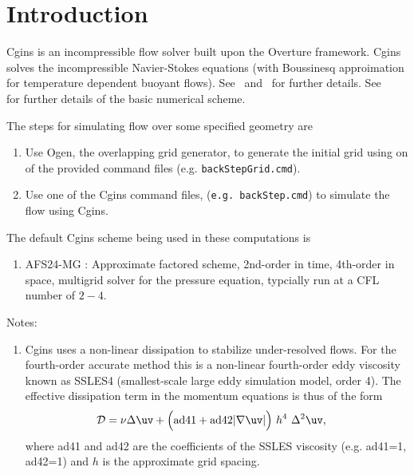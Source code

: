 \documentclass[11pt]{article}
\newcommand{\grad}{\nabla}
\begin{document}
\tableofcontents

\clearpage


\section{Introduction}

Cgins is an incompressible flow solver built upon the Overture framework.
Cgins solves the incompressible Navier-Stokes equations (with Boussinesq approimation
for temperature dependent buoyant flows). See~\cite{CginsUserGuide} and~\cite{CginsReferenceManual} for further 
details. See~\cite{ICNS}~\cite{splitStep2003} for further details of the basic numerical scheme. 

The steps for simulating flow over some specified geometry are
\begin{enumerate}
  \item Use Ogen, the overlapping grid generator, to generate the initial grid using on of the provided command files (e.g. {\tt backStepGrid.cmd}).
  \item Use one of the Cgins command files,  ({\tt e.g. backStep.cmd}) to simulate the flow using Cgins.
\end{enumerate}

The default Cgins scheme being used in these computations is 
\begin{enumerate}
  \item AFS24-MG : Approximate factored scheme, 2nd-order in time, 4th-order in space, multigrid solver for the pressure equation,
    typcially run at a CFL number of $2-4$. 
\end{enumerate}

Notes:
\begin{enumerate}
  \item Cgins uses a non-linear dissipation to stabilize under-resolved flows. For the fourth-order accurate method this is
    a non-linear fourth-order eddy viscosity known as SSLES4 (smallest-scale large eddy simulation model, order 4).
  The effective dissipation term in the momentum equations is thus of the form
  \begin{align*}
     \Dc & =  \nu \Delta \uv  + \Big(\text{ad41} + \text{ad42} \vert \grad\uv\vert \Big) ~h^4~ \Delta^2 \uv , 
  \end{align*}
  where ad41 and ad42 are the coefficients of the SSLES viscosity (e.g. ad41=1, ad42=1) and $h$ is the approximate grid spacing.
\end{enumerate}
\end{document}
